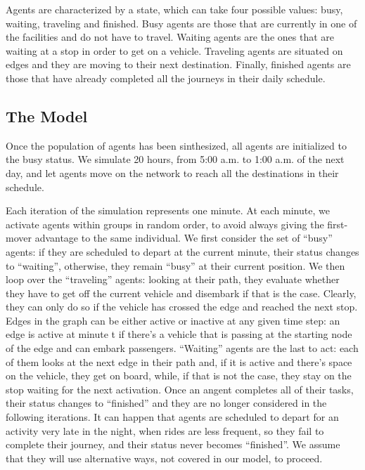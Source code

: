 Agents are characterized by a state, which can take four possible values: busy, waiting, traveling and finished. Busy agents are those that are currently in one of the facilities and do not have to travel. Waiting agents are the ones that are waiting at a stop in order to get on a vehicle. Traveling agents are situated on edges and they are moving to their next destination. Finally, finished agents are those that have already completed all the journeys in their daily schedule.

\subsection{The Model}

Once the population of agents has been sinthesized, all agents are initialized to the busy status. We simulate 20 hours, from 5:00 a.m. to 1:00 a.m. of the next day, and let agents move on the network to reach all the destinations in their schedule. 

Each iteration of the simulation represents one minute. At each minute, we activate agents within groups in random order, to avoid always giving the first-mover advantage to the same individual. We first consider the set of “busy” agents: if they are scheduled to depart at the current minute, their status changes to “waiting”, otherwise, they remain “busy” at their current position. We then loop over the “traveling” agents: looking at their path, they evaluate whether they have to get off the current vehicle and disembark if that is the case. Clearly, they can only do so if the vehicle has crossed the edge and reached the next stop. Edges in the graph can be either active or inactive at any given time step: an edge is active at minute t if there’s a vehicle that is passing at the starting node of the edge and can embark passengers. “Waiting” agents are the last to act: each of them looks at the next edge in their path and, if it is active and there’s space on the vehicle, they get on board, while, if that is not the case, they stay on the stop waiting for the next activation. Once an angent completes all of their tasks, their status changes to “finished” and they are no longer considered in the following iterations. It can happen that agents are scheduled to depart for an activity very late in the night, when rides are less frequent, so they fail to complete their journey, and their status never becomes “finished”. We assume that they will use alternative ways, not covered in our model, to proceed.

